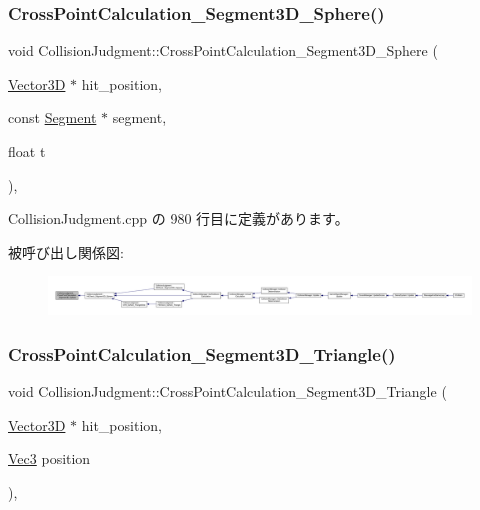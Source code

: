 \subsubsection{\texorpdfstring{Cross\+Point\+Calculation\+\_\+\+Segment3\+D\+\_\+\+Sphere()}{CrossPointCalculation\_Segment3D\_Sphere()}}
{\footnotesize\ttfamily void Collision\+Judgment\+::\+Cross\+Point\+Calculation\+\_\+\+Segment3\+D\+\_\+\+Sphere (\begin{DoxyParamCaption}\item[{\mbox{\hyperlink{class_vector3_d}{Vector3D}} $\ast$}]{hit\+\_\+position,  }\item[{const \mbox{\hyperlink{class_segment}{Segment}} $\ast$}]{segment,  }\item[{float}]{t }\end{DoxyParamCaption})\hspace{0.3cm}{\ttfamily [static]}, {\ttfamily [private]}}



 Collision\+Judgment.\+cpp の 980 行目に定義があります。

被呼び出し関係図\+:
\nopagebreak
\begin{figure}[H]
\begin{center}
\leavevmode
\includegraphics[width=350pt]{class_collision_judgment_a5a2de0fe24c1a632c3ee23a20853a57a_icgraph}
\end{center}
\end{figure}
\mbox{\label{class_collision_judgment_a663c13a9729109b140b9ab6e022fd469}} 
\subsubsection{\texorpdfstring{Cross\+Point\+Calculation\+\_\+\+Segment3\+D\+\_\+\+Triangle()}{CrossPointCalculation\_Segment3D\_Triangle()}}
{\footnotesize\ttfamily void Collision\+Judgment\+::\+Cross\+Point\+Calculation\+\_\+\+Segment3\+D\+\_\+\+Triangle (\begin{DoxyParamCaption}\item[{\mbox{\hyperlink{class_vector3_d}{Vector3D}} $\ast$}]{hit\+\_\+position,  }\item[{\mbox{\hyperlink{_vector3_d_8h_ab16f59e4393f29a01ec8b9bbbabbe65d}{Vec3}}}]{position }\end{DoxyParamCaption})\hspace{0.3cm}{\ttfamily [static]}, {\ttfamily [private]}}



